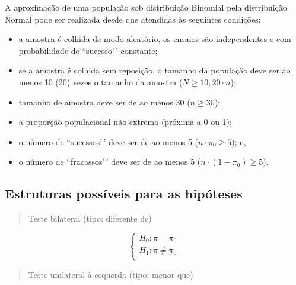 \documentclass[
]{book}
\providecommand{\tightlist}{%
  \setlength{\itemsep}{0pt}\setlength{\parskip}{0pt}}
\begin{document}
\hfill\break

A aproximação de uma população sob distribuição Binomial pela distribuição Normal pode ser realizada desde que atendidas às seguintes condições:

\hfill\break

\begin{itemize}
\tightlist
\item
  a amostra é colhida de modo aleatório, os ensaios são independentes e com probabilidade de ``sucesso'\,' constante;\\
\item
  se a amostra é colhida sem reposição, o tamanho da população deve ser ao menos 10 (20) vezes o tamanho da amostra (\(N \ge 10,20 \cdot n\));\\
\item
  tamanho de amostra deve ser de ao menos 30 (\(n \ge 30\));\\
\item
  a proporção populacional não extrema (próxima a 0 ou 1);\\
\item
  o número de ``sucessos'\,' deve ser de ao menos 5 (\(n \cdot \pi_{0} \ge 5\)); e,\\
\item
  o número de ``fracassos'\,' deve ser de ao menos 5 (\(n \cdot (1-\pi_{0}) \ge 5\)).
\end{itemize}

\hfill\break

\hypertarget{estruturas-possuxedveis-para-as-hipuxf3teses-1}{%
\subsection{Estruturas possíveis para as hipóteses}\label{estruturas-possuxedveis-para-as-hipuxf3teses-1}}

\hfill\break

\begin{quote}
Teste bilateral (tipo: diferente de)
\end{quote}

\hfill\break

\[
\begin{cases}
    H_{0}: \pi = \pi_{0}\\
    H_{1}: \pi \ne \pi_{0}\\
\end{cases}
\]

\hfill\break

\begin{quote}
Teste unilateral à esquerda (tipo: menor que)
\end{quote}
\end{document}
